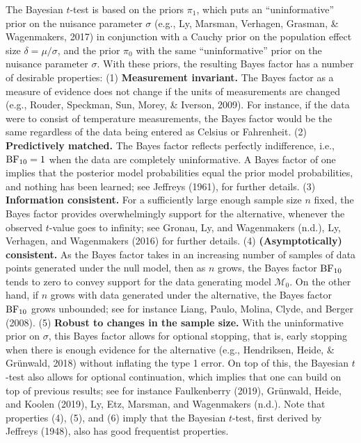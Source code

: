 \documentclass[english,,doc,floatsintext]{apa6}
\begin{document}
The Bayesian \(t\)-test is based on the priors \(\pi_{1}\), which puts an \enquote{uninformative} prior on the nuisance parameter \(\sigma\) (e.g., Ly, Marsman, Verhagen, Grasman, \& Wagenmakers, 2017) in conjunction with a Cauchy prior on the population effect size \(\delta = \mu / \sigma\), and the prior \(\pi_{0}\) with the same \enquote{uninformative} prior on the nuisance parameter \(\sigma\). With these priors, the resulting Bayes factor has a number of desirable properties: (1) \textbf{Measurement invariant.} The Bayes factor as a measure of evidence does not change if the units of measurements are changed (e.g., Rouder, Speckman, Sun, Morey, \& Iverson, 2009). For instance, if the data were to consist of temperature measurements, the Bayes factor would be the same regardless of the data being entered as Celsius or Fahrenheit. (2) \textbf{Predictively matched.} The Bayes factor reflects perfectly indifference, i.e., \(\textnormal{BF}_{10}=1\) when the data are completely uninformative. A Bayes factor of one implies that the posterior model probabilities equal the prior model probabilities, and nothing has been learned; see Jeffreys (1961), for further details. (3) \textbf{Information consistent.} For a sufficiently large enough sample size \(n\) fixed, the Bayes factor provides overwhelmingly support for the alternative, whenever the observed \(t\)-value goes to infinity; see Gronau, Ly, and Wagenmakers (n.d.), Ly, Verhagen, and Wagenmakers (2016) for further details. (4) \textbf{(Asymptotically) consistent.} As the Bayes factor takes in an increasing number of samples of data points generated under the null model, then as \(n\) grows, the Bayes factor \(\textnormal{BF}_{10}\) tends to zero to convey support for the data generating model \(\mathcal{M}_{0}\). On the other hand, if \(n\) grows with data generated under the alternative, the Bayes factor \(\textnormal{BF}_{10}\) grows unbounded; see for instance Liang, Paulo, Molina, Clyde, and Berger (2008). (5) \textbf{Robust to changes in the sample size.} With the uninformative prior on \(\sigma\), this Bayes factor allows for optional stopping, that is, early stopping when there is enough evidence for the alternative (e.g., Hendriksen, Heide, \& Grünwald, 2018) without inflating the type 1 error. On top of this, the Bayesian \(t\)-test also allows for optional continuation, which implies that one can build on top of previous results; see for instance Faulkenberry (2019), Grünwald, Heide, and Koolen (2019), Ly, Etz, Marsman, and Wagenmakers (n.d.). Note that properties (4), (5), and (6) imply that the Bayesian \(t\)-test, first derived by Jeffreys (1948), also has good frequentist properties.
\end{document}
